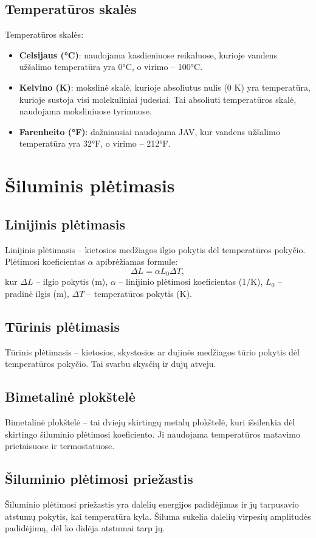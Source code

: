 \documentclass[a4paper,12pt]{article}
\begin{document}
\subsection{Temperatūros skalės}

Temperatūros skalės:
\begin{itemize}
    \item \textbf{Celsijaus (°C)}: naudojama kasdieniuose reikaluose, kurioje vandens užšalimo temperatūra yra 0°C, o virimo – 100°C.
    \item \textbf{Kelvino (K)}: mokslinė skalė, kurioje absoliutus nulis (0 K) yra temperatūra, kurioje sustoja visi molekuliniai judesiai. Tai absoliuti temperatūros skalė, naudojama moksliniuose tyrimuose.
    \item \textbf{Farenheito (°F)}: dažniausiai naudojama JAV, kur vandens užšalimo temperatūra yra 32°F, o virimo – 212°F.
\end{itemize}

\section{Šiluminis plėtimasis}

\subsection{Linijinis plėtimasis}
Linijinis plėtimasis – kietosios medžiagos ilgio pokytis dėl temperatūros pokyčio. Plėtimosi koeficientas $\alpha$ apibrėžiamas formule:
\[
\Delta L = \alpha L_0 \Delta T,
\]
kur $\Delta L$ – ilgio pokytis (m), $\alpha$ – linijinio plėtimosi koeficientas (1/K), $L_0$ – pradinė ilgis (m), $\Delta T$ – temperatūros pokytis (K).

\subsection{Tūrinis plėtimasis}
Tūrinis plėtimasis – kietosios, skystosios ar dujinės medžiagos tūrio pokytis dėl temperatūros pokyčio. Tai svarbu skysčių ir dujų atveju.

\subsection{Bimetalinė plokštelė}
Bimetalinė plokštelė – tai dviejų skirtingų metalų plokštelė, kuri išsilenkia dėl skirtingo šiluminio plėtimosi koeficiento. Ji naudojama temperatūros matavimo prietaisuose ir termostatuose.

\subsection{Šiluminio plėtimosi priežastis}
Šiluminio plėtimosi priežastis yra dalelių energijos padidėjimas ir jų tarpusavio atstumų pokytis, kai temperatūra kyla. Šiluma sukelia dalelių virpesių amplitudės padidėjimą, dėl ko didėja atstumai tarp jų.
\end{document}
